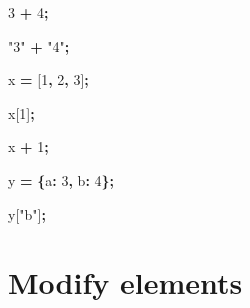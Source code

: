 \documentclass[openany]{book}
\newenvironment{Shaded}{\begin{snugshade}}{\end{snugshade}}
\newcommand{\DataTypeTok}[1]{\textcolor[rgb]{0.13,0.29,0.53}{#1}}
\newcommand{\DecValTok}[1]{\textcolor[rgb]{0.00,0.00,0.81}{#1}}
\newcommand{\NormalTok}[1]{#1}
\newcommand{\OperatorTok}[1]{\textcolor[rgb]{0.81,0.36,0.00}{\textbf{#1}}}
\newcommand{\StringTok}[1]{\textcolor[rgb]{0.31,0.60,0.02}{#1}}
\begin{document}
\begin{Shaded}
\begin{Highlighting}[]
\DecValTok{3} \OperatorTok{+} \DecValTok{4}\OperatorTok{;}
    
\StringTok{"3"} \OperatorTok{+} \StringTok{"4"}\OperatorTok{;}

\NormalTok{ x }\OperatorTok{=}\NormalTok{ [}\DecValTok{1}\OperatorTok{,} \DecValTok{2}\OperatorTok{,} \DecValTok{3}\NormalTok{]}\OperatorTok{;}
    
\NormalTok{x[}\DecValTok{1}\NormalTok{]}\OperatorTok{;}
    
\NormalTok{x }\OperatorTok{+} \DecValTok{1}\OperatorTok{;}
    
\NormalTok{y }\OperatorTok{=} \OperatorTok{\{}\DataTypeTok{a}\OperatorTok{:} \DecValTok{3}\OperatorTok{,} \DataTypeTok{b}\OperatorTok{:} \DecValTok{4}\OperatorTok{\};}
    
\NormalTok{y[}\StringTok{"b"}\NormalTok{]}\OperatorTok{;}
\end{Highlighting}
\end{Shaded}

\hypertarget{modify-elements}{%
\section{Modify elements }\label{modify-elements}}
\end{document}

